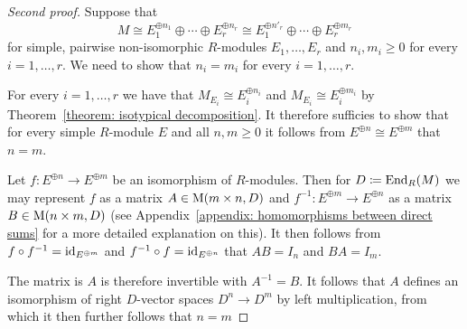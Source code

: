 \begin{proof}[Second proof]
  Suppose that
  \[
          M
    \cong E_1^{\oplus n_1} \oplus \dotsb \oplus E_r^{\oplus n_r}
    \cong E_1^{\oplus n'_r} \oplus \dotsb \oplus E_r^{\oplus m_r}
  \]
  for simple, pairwise non-isomorphic $R$-modules $E_1, \dotsc, E_r$ and $n_i, m_i \geq 0$ for every $i = 1, \dotsc, r$.
  We need to show that $n_i = m_i$ for every $i = 1, \dotsc, r$.
  
  For every $i = 1, \dotsc, r$ we have that $M_{E_i} \cong E_i^{\oplus n_i}$ and $M_{E_i} \cong E_i^{\oplus m_i}$ by Theorem~\ref{theorem: isotypical decomposition}.
  It therefore sufficies to show that for every simple $R$-module $E$ and all $n, m \geq 0$ it follows from $E^{\oplus n} \cong E^{\oplus m}$ that $n = m$.
  
  Let $f \colon E^{\oplus n} \to E^{\oplus m}$ be an isomorphism of $R$-modules.
  Then for $D \coloneqq \operatorname{End}_R(M)$ we may represent $f$ as a matrix $A \in \operatorname{M}(m \times n, D)$ and $f^{-1} \colon E^{\oplus m} \to E^{\oplus n}$ as a matrix $B \in \operatorname{M}(n \times m, D)$ (see Appendix~\ref{appendix: homomorphisms between direct sums} for a more detailed explanation on this).
  It then follows from $f \circ f^{-1} = \operatorname{id}_{E^{\oplus m}}$ and $f^{-1} \circ f = \operatorname{id}_{E^{\oplus n}}$ that $AB = I_n$ and $BA = I_m$.
  
  The matrix is $A$ is therefore invertible with $A^{-1} = B$.
  It follows that $A$ defines an isomorphism of right $D$-vector spaces $D^n \to D^{m}$ by left multiplication, from which it then further follows that $n = m$
\end{proof}




%   
%   


